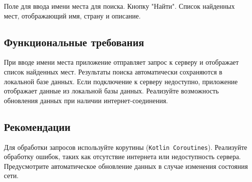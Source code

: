 Поле для ввода имени места для поиска.
Кнопку "Найти".
Список найденных мест, отображающий имя, страну и описание.
\subsection{Функциональные требования}

При вводе имени места приложение отправляет запрос к серверу и отображает список найденных мест.
Результаты поиска автоматически сохраняются в локальной базе данных.
Если подключение к серверу недоступно, приложение отображает данные из локальной базы данных.
Реализуйте возможность обновления данных при наличии интернет-соединения.
\subsection{Рекомендации}

Для обработки запросов используйте корутины (\texttt{Kotlin Coroutines}).
Реализуйте обработку ошибок, таких как отсутствие интернета или недоступность сервера.
Предусмотрите автоматическое обновление данных в случае изменения состояния сети.

